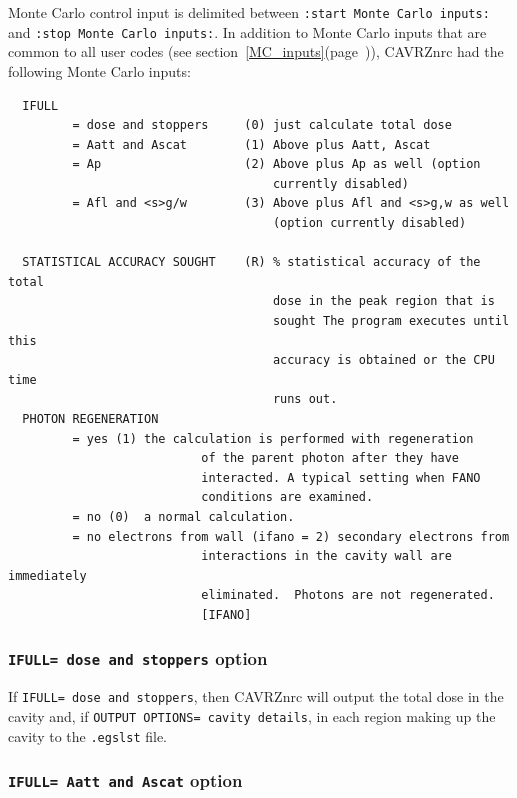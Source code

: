 \documentclass[12pt,twoside]{article}  %
\newcommand{\lpage}[1]{(page~\pageref{#1})}
\begin{document}
Monte Carlo control input is delimited between
\verb+:start Monte Carlo inputs:+\\
and \verb+:stop Monte Carlo inputs:+.  In addition to Monte Carlo inputs that
are common to all user codes (see
section~\ref{MC_inputs}\lpage{MC_inputs}), CAVRZnrc had the following
Monte Carlo inputs:
\begin{verbatim}
  IFULL
         = dose and stoppers     (0) just calculate total dose
         = Aatt and Ascat        (1) Above plus Aatt, Ascat
         = Ap                    (2) Above plus Ap as well (option
                                     currently disabled)
         = Afl and <s>g/w        (3) Above plus Afl and <s>g,w as well
                                     (option currently disabled)

  STATISTICAL ACCURACY SOUGHT    (R) % statistical accuracy of the total
                                     dose in the peak region that is
                                     sought The program executes until this
                                     accuracy is obtained or the CPU time
                                     runs out.
  PHOTON REGENERATION
         = yes (1) the calculation is performed with regeneration
                           of the parent photon after they have
                           interacted. A typical setting when FANO
                           conditions are examined.
         = no (0)  a normal calculation.
         = no electrons from wall (ifano = 2) secondary electrons from
                           interactions in the cavity wall are immediately
                           eliminated.  Photons are not regenerated.
                           [IFANO]
\end{verbatim}

\subsubsection{{\tt IFULL= dose and stoppers} option}
\label{cavrzifullsect1}

If {\tt IFULL= dose and stoppers}, then CAVRZnrc will output the total
dose in the cavity and, if {\tt OUTPUT OPTIONS= cavity details},
in each region making up the cavity to the {\tt .egslst} file.

\subsubsection{{\tt IFULL= Aatt and Ascat} option}
\label{cavrzifullsect2}
\end{document}
